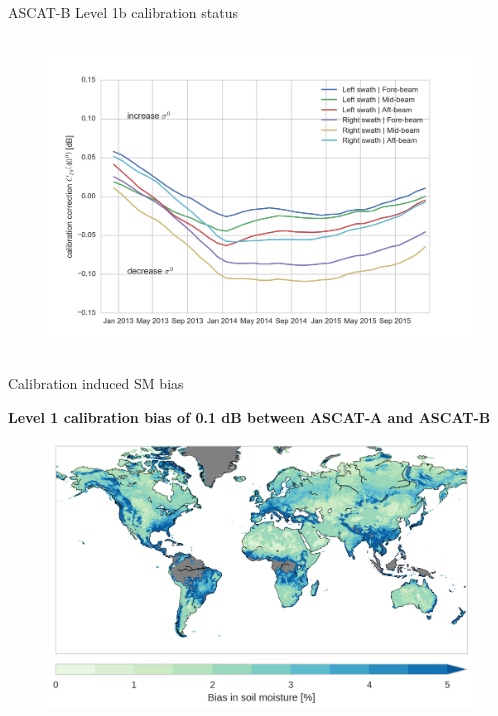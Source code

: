 \documentclass[10pt,ignorenonframetext,xcolor={dvipsnames, table}]{beamer}
\begin{document}
\begin{frame}{ASCAT-B Level 1b calibration status}
\begin{columns}
\begin{figure}
\includegraphics[width=.99\textwidth]{./figures/metop_b_ascat_calibration.png}
\end{figure}

\end{columns}

\end{frame}

\begin{frame}{Calibration induced SM bias}

\begin{center}
\textbf{Level 1 calibration bias of 0.1 dB between ASCAT-A and ASCAT-B}
\end{center}

\begin{figure}
\includegraphics[width=.9\textwidth]{./figures/metop_b_ssm_cal_bias.png}
\end{figure}

\end{frame}
\end{document}
